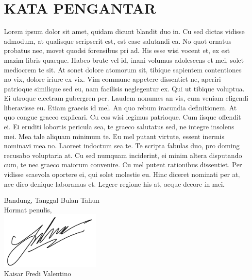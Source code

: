 \chapter*{KATA PENGANTAR}
Lorem ipsum dolor sit amet, quidam dicunt blandit duo in. Cu sed dictas vidisse admodum, at qualisque scripserit est, est case salutandi ea. No quot ornatus probatus nec, movet quodsi forensibus pri ad. His esse wisi vocent et, ex est mazim libris quaeque. Habeo brute vel id, inani volumus adolescens et mei, solet mediocrem te sit.
At sonet dolore atomorum sit, tibique sapientem contentiones no vix, dolore iriure ex vix. Vim commune appetere dissentiet ne, aperiri patrioque similique sed eu, nam facilisis neglegentur ex. Qui ut tibique voluptua. Ei utroque electram gubergren per. Laudem nonumes an vis, cum veniam eligendi liberavisse eu. Etiam graecis id mel.
An quo rebum iracundia definitionem. At quo congue graeco explicari. Cu eos wisi legimus patrioque. Cum iisque offendit ei.
Ei eruditi lobortis pericula sea, te graeco salutatus sed, ne integre insolens mei. Mea tale aliquam minimum te. Eu mel putant virtute, essent inermis nominavi mea no. Laoreet indoctum sea te. Te scripta fabulas duo, pro doming recusabo voluptaria at. Cu sed numquam inciderint, ei minim altera disputando cum, te nec graeco maiorum convenire.
Cu mel putent rationibus dissentiet. Per vidisse scaevola oportere ei, qui solet molestie eu. Hinc diceret nominati per at, nec dico denique laboramus et. Legere regione his at, aeque decore in mei.

\hfill{
\begin{flushright} Bandung, Tanggal Bulan Tahun\\
Hormat  penulis,\\
\includegraphics[width=5cm]{img/sign.png}\\
Kaisar Fredi Valentino
\end{flushright}}